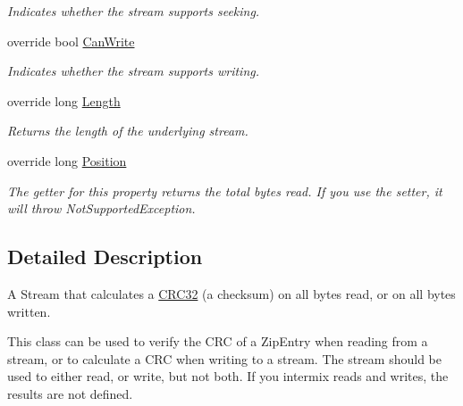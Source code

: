\begin{DoxyCompactItemize}
\begin{DoxyCompactList}\small\item\em Indicates whether the stream supports seeking. \end{DoxyCompactList}\item 
override bool \mbox{\hyperlink{class_super_tiled2_unity_1_1_ionic_1_1_crc_1_1_crc_calculator_stream_a2fdeacbd063fae5fb987f223bf7e5bcb}{Can\+Write}}
\begin{DoxyCompactList}\small\item\em Indicates whether the stream supports writing. \end{DoxyCompactList}\item 
override long \mbox{\hyperlink{class_super_tiled2_unity_1_1_ionic_1_1_crc_1_1_crc_calculator_stream_ad743ed8196bc2eda561d7afb0f6adb60}{Length}}
\begin{DoxyCompactList}\small\item\em Returns the length of the underlying stream. \end{DoxyCompactList}\item 
override long \mbox{\hyperlink{class_super_tiled2_unity_1_1_ionic_1_1_crc_1_1_crc_calculator_stream_ad45b18ed1767984cace5bb4514e8269e}{Position}}
\begin{DoxyCompactList}\small\item\em The getter for this property returns the total bytes read. If you use the setter, it will throw Not\+Supported\+Exception. \end{DoxyCompactList}\end{DoxyCompactItemize}


\subsection{Detailed Description}
A Stream that calculates a \mbox{\hyperlink{class_super_tiled2_unity_1_1_ionic_1_1_crc_1_1_c_r_c32}{C\+R\+C32}} (a checksum) on all bytes read, or on all bytes written. 

This class can be used to verify the C\+RC of a Zip\+Entry when reading from a stream, or to calculate a C\+RC when writing to a stream. The stream should be used to either read, or write, but not both. If you intermix reads and writes, the results are not defined. 

